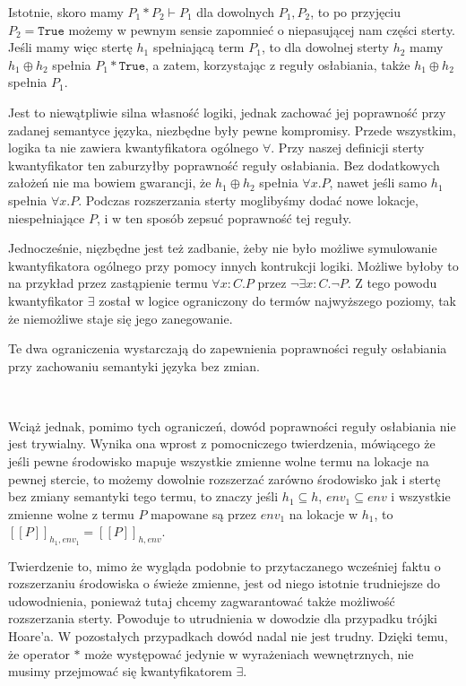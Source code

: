 \documentclass[]{pracamgr}
\renewcommand \| {\hspace{0.75em} | \hspace{0.75em} }
\renewcommand \[ {[\![}
\renewcommand \] {]\!]}
\theoremstyle{definition}
\begin{document}
Istotnie, skoro mamy $P_1 * P_2 \vdash P_1$ dla dowolnych $P_1, P_2$,
to po przyjęciu $P_2 = \texttt{True}$ możemy w pewnym sensie zapomnieć o niepasującej nam części
sterty. Jeśli mamy więc stertę $h_1$ spełniającą term $P_1$, to dla dowolnej sterty $h_2$ mamy
$h_1 \oplus h_2$ spełnia $P_1 * \mathtt{True}$, a zatem, korzystając z reguły osłabiania, także
$h_1 \oplus h_2$ spełnia $P_1$.

Jest to niewątpliwie silna własność logiki, jednak zachować jej poprawność przy zadanej semantyce
języka, niezbędne były pewne kompromisy. Przede wszystkim, logika ta nie zawiera kwantyfikatora
ogólnego $\forall$. Przy naszej definicji sterty kwantyfikator ten zaburzyłby poprawność reguły
osłabiania. Bez dodatkowych założeń nie ma bowiem gwarancji, że $h_1 \oplus h_2$ spełnia
$\forall x . P$, nawet jeśli samo $h_1$ spełnia $\forall x . P$. Podczas rozszerzania sterty moglibyśmy
dodać nowe lokacje, niespełniające $P$, i w ten sposób zepsuć poprawność tej reguły.

Jednocześnie, nięzbędne jest też zadbanie, żeby nie było możliwe symulowanie kwantyfikatora ogólnego
przy pomocy innych kontrukcji logiki. Możliwe byłoby to na przykład przez zastąpienie
termu $\forall x : C . P$ przez $\neg \exists x : C . \neg P$.
Z tego powodu kwantyfikator $\exists$ został w logice ograniczony do termów najwyższego poziomy, tak
że niemożliwe staje się jego zanegowanie.

Te dwa ograniczenia wystarczają do zapewnienia poprawności reguły osłabiania przy zachowaniu
semantyki języka bez zmian.

{\ }

Wciąż jednak, pomimo tych ograniczeń, dowód poprawności reguły osłabiania nie jest trywialny.
Wynika ona wprost z pomocniczego twierdzenia, mówiącego że jeśli pewne środowisko mapuje
wszystkie zmienne wolne termu na lokacje na pewnej stercie, to możemy dowolnie rozszerzać zarówno
środowisko jak i stertę bez zmiany semantyki tego termu, to znaczy jeśli
$h_1 \subseteq h$, $env_1 \subseteq env$ i wszystkie zmienne wolne z termu $P$
mapowane są przez $env_1$ na lokacje w $h_1$, to $\[ P \]_{h_1, env_1} = \[ P \]_{h, env}$.

Twierdzenie to, mimo że wygląda podobnie to przytaczanego wcześniej faktu o rozszerzaniu środowiska
o świeże zmienne, jest od niego istotnie trudniejsze do udowodnienia, ponieważ tutaj chcemy
zagwarantować także możliwość rozszerzania sterty.
Powoduje to utrudnienia w dowodzie dla przypadku trójki Hoare'a. W pozostałych przypadkach
dowód nadal nie jest trudny. Dzięki temu, że operator $*$ może występować jedynie w
wyrażeniach wewnętrznych, nie musimy przejmować się kwantyfikatorem $\exists$.
\end{document}
